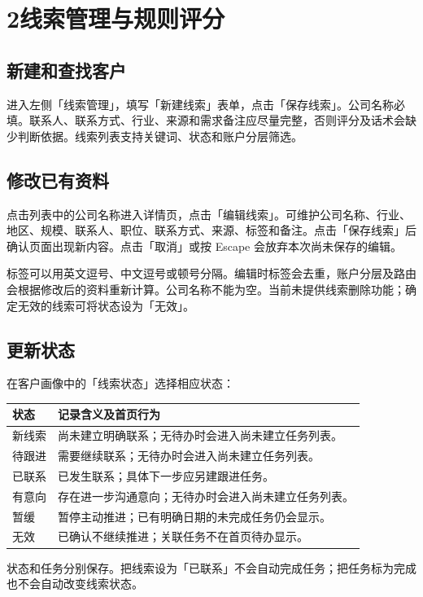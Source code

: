 \documentclass[UTF8,fontset=fandol,zihao=5,a4paper]{ctexart}
\begin{document}
\newpage
\section*{2\quad 线索管理与规则评分}
\subsection*{新建和查找客户}
进入左侧「线索管理」，填写「新建线索」表单，点击「保存线索」。公司名称必填。联系人、联系方式、行业、来源和需求备注应尽量完整，否则评分及话术会缺少判断依据。线索列表支持关键词、状态和账户分层筛选。

\subsection*{修改已有资料}
点击列表中的公司名称进入详情页，点击「编辑线索」。可维护公司名称、行业、地区、规模、联系人、职位、联系方式、来源、标签和备注。点击「保存线索」后确认页面出现新内容。点击「取消」或按 Escape 会放弃本次尚未保存的编辑。

标签可以用英文逗号、中文逗号或顿号分隔。编辑时标签会去重，账户分层及路由会根据修改后的资料重新计算。公司名称不能为空。当前未提供线索删除功能；确定无效的线索可将状态设为「无效」。

\subsection*{更新状态}
在客户画像中的「线索状态」选择相应状态：
\par\noindent
\begin{tabularx}{\linewidth}{@{}lY@{}}
\toprule
状态 & 记录含义及首页行为 \\
\midrule
新线索 & 尚未建立明确联系；无待办时会进入尚未建立任务列表。\\
待跟进 & 需要继续联系；无待办时会进入尚未建立任务列表。\\
已联系 & 已发生联系；具体下一步应另建跟进任务。\\
有意向 & 存在进一步沟通意向；无待办时会进入尚未建立任务列表。\\
暂缓 & 暂停主动推进；已有明确日期的未完成任务仍会显示。\\
无效 & 已确认不继续推进；关联任务不在首页待办显示。\\
\bottomrule
\end{tabularx}
\par

状态和任务分别保存。把线索设为「已联系」不会自动完成任务；把任务标为完成也不会自动改变线索状态。
\end{document}

